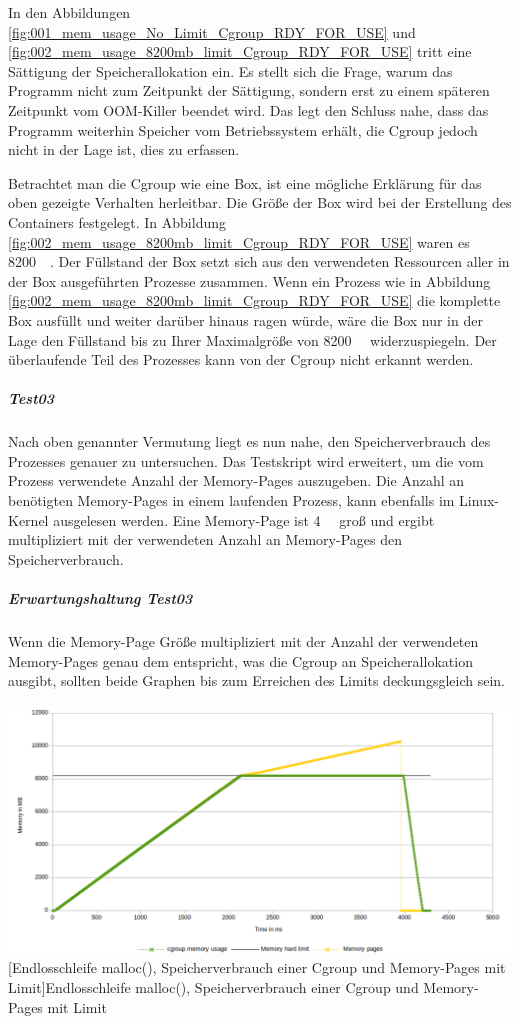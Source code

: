 In den Abbildungen \ref{fig:001_mem_usage_No_Limit_Cgroup_RDY_FOR_USE} und \ref{fig:002_mem_usage_8200mb_limit_Cgroup_RDY_FOR_USE} tritt eine Sättigung der Speicherallokation ein. Es stellt sich die Frage, warum das Programm nicht zum Zeitpunkt der Sättigung, sondern erst zu einem späteren Zeitpunkt vom OOM-Killer beendet wird. Das legt den Schluss nahe, dass das Programm weiterhin Speicher vom Betriebssystem erhält, die Cgroup jedoch nicht in der Lage ist, dies zu erfassen. 

Betrachtet man die Cgroup wie eine Box, ist eine mögliche Erklärung für das oben gezeigte Verhalten herleitbar. Die Größe der Box wird bei der Erstellung des Containers festgelegt. In Abbildung \ref{fig:002_mem_usage_8200mb_limit_Cgroup_RDY_FOR_USE} waren es \SI{8200}{\mega\byte}. Der Füllstand der Box setzt sich aus den verwendeten Ressourcen aller in der Box ausgeführten Prozesse zusammen. Wenn ein Prozess wie in Abbildung \ref{fig:002_mem_usage_8200mb_limit_Cgroup_RDY_FOR_USE} die komplette Box ausfüllt und weiter darüber hinaus ragen würde, wäre die Box nur in der Lage den Füllstand bis zu Ihrer Maximalgröße von \SI{8200}{\mega\byte} widerzuspiegeln. Der überlaufende Teil des Prozesses kann von der Cgroup nicht erkannt werden.

\subparagraph{Test03}
Nach oben genannter Vermutung liegt es nun nahe, den Speicherverbrauch des Prozesses genauer zu untersuchen. Das Testskript wird erweitert, um die vom Prozess verwendete Anzahl der Memory-Pages auszugeben. Die Anzahl an benötigten Memory-Pages in einem laufenden Prozess, kann ebenfalls im Linux-Kernel ausgelesen werden. Eine Memory-Page ist \SI{4}{\kilo\byte} groß und ergibt multipliziert mit der verwendeten Anzahl an Memory-Pages den Speicherverbrauch.

\subparagraph{Erwartungshaltung Test03}
Wenn die Memory-Page Größe multipliziert mit der Anzahl der verwendeten Memory-Pages genau dem entspricht, was die Cgroup an Speicherallokation ausgibt, sollten beide Graphen bis zum Erreichen des Limits deckungsgleich sein.

\vspace{1em}
\begin{minipage}{\linewidth}
	\centering
	\includegraphics[width=1\linewidth]{pics/003_mem_usage_8200mb_limit_Cgroup_Pages_RDY_FOR_USE.png}
	[Endlosschleife malloc(), Speicherverbrauch einer Cgroup und Memory-Pages mit Limit]{Endlosschleife malloc(), Speicherverbrauch einer Cgroup und Memory-Pages mit Limit}
	\label{fig:003_mem_usage_8200mb_limit_Cgroup_Pages_RDY_FOR_USE}
\end{minipage}

